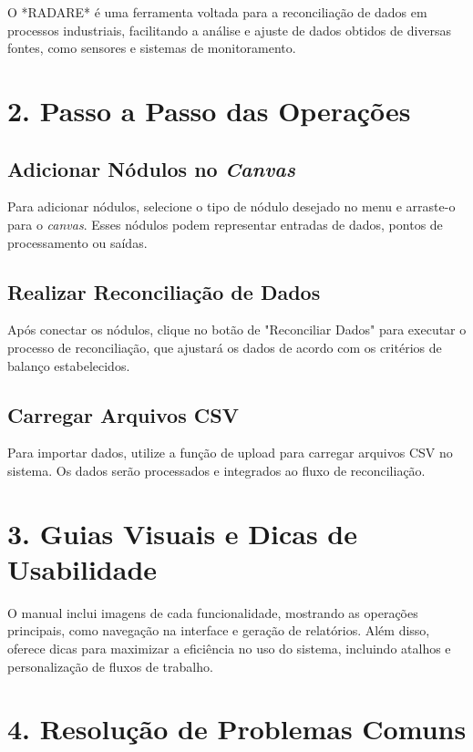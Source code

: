 O *RADARE* é uma ferramenta voltada para a reconciliação de dados em processos industriais, facilitando a análise e ajuste de dados obtidos de diversas fontes, como sensores e sistemas de monitoramento.

\section*{2. Passo a Passo das Operações}

\subsection*{Adicionar Nódulos no \textit{Canvas}}

Para adicionar nódulos, selecione o tipo de nódulo desejado no menu e arraste-o para o \textit{canvas}. Esses nódulos podem representar entradas de dados, pontos de processamento ou saídas. 

\subsection*{Realizar Reconciliação de Dados}

Após conectar os nódulos, clique no botão de "Reconciliar Dados" para executar o processo de reconciliação, que ajustará os dados de acordo com os critérios de balanço estabelecidos.

\subsection*{Carregar Arquivos CSV}

Para importar dados, utilize a função de upload para carregar arquivos CSV no sistema. Os dados serão processados e integrados ao fluxo de reconciliação.

\section*{3. Guias Visuais e Dicas de Usabilidade}

O manual inclui imagens de cada funcionalidade, mostrando as operações principais, como navegação na interface e geração de relatórios. Além disso, oferece dicas para maximizar a eficiência no uso do sistema, incluindo atalhos e personalização de fluxos de trabalho.

\section*{4. Resolução de Problemas Comuns}

